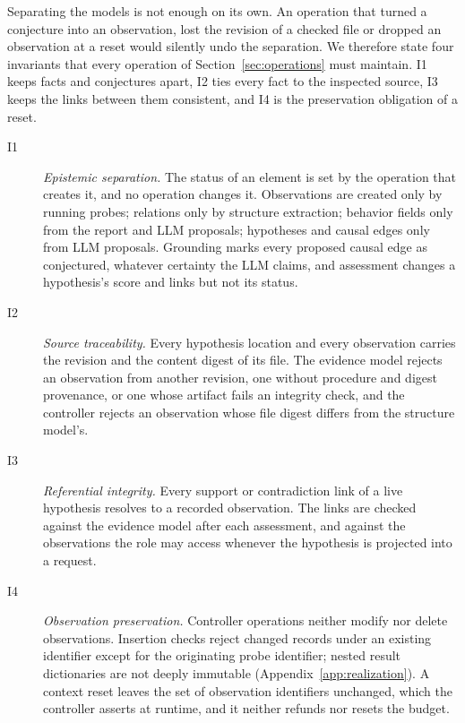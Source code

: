 \documentclass[a4paper,fleqn]{cas-sc}
\begin{document}
Separating the models is not enough on its own. An operation that turned a conjecture into an observation, lost the revision of a checked file or dropped an observation at a reset would silently undo the separation. We therefore state four invariants that every operation of Section~\ref{sec:operations} must maintain. I1 keeps facts and conjectures apart, I2 ties every fact to the inspected source, I3 keeps the links between them consistent, and I4 is the preservation obligation of a reset.
\begin{description}
\item[I1] \emph{Epistemic separation.} The status of an element is set by the operation that creates it, and no operation changes it. Observations are created only by running probes; relations only by structure extraction; behavior fields only from the report and LLM proposals; hypotheses and causal edges only from LLM proposals. Grounding marks every proposed causal edge as conjectured, whatever certainty the LLM claims, and assessment changes a hypothesis's score and links but not its status.
\item[I2] \emph{Source traceability.} Every hypothesis location and every observation carries the revision and the content digest of its file. The evidence model rejects an observation from another revision, one without procedure and digest provenance, or one whose artifact fails an integrity check, and the controller rejects an observation whose file digest differs from the structure model's.
\item[I3] \emph{Referential integrity.} Every support or contradiction link of a live hypothesis resolves to a recorded observation. The links are checked against the evidence model after each assessment, and against the observations the role may access whenever the hypothesis is projected into a request.
\item[I4] \emph{Observation preservation.} Controller operations neither modify nor delete observations. Insertion checks reject changed records under an existing identifier except for the originating probe identifier; nested result dictionaries are not deeply immutable (Appendix~\ref{app:realization}). A context reset leaves the set of observation identifiers unchanged, which the controller asserts at runtime, and it neither refunds nor resets the budget.
\end{description}
\end{document}
